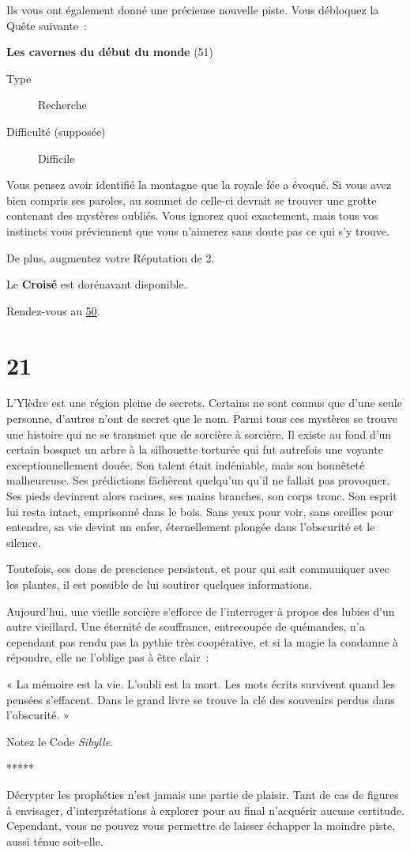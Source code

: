 \documentclass{report}
\newcommand{\gsection}[1]{
    \section{#1}
    \label{section-#1}
}
\newcommand{\glink}[1]{\hyperref[section-#1]{#1}}
\newcommand{\quest}[5]{
    \begin{mdframed}[innertopmargin=0.5cm,innerbottommargin=0.5cm]
        \begin{center}
            \textbf{#1} (#2)
        \end{center}
        \begin{description}
            \item[Type] #3
            \item[Difficulté (supposée)] #4
        \end{description}
        #5
    \end{mdframed}
}
\newcommand{\ellipse}{
    \begin{center}
        *****
    \end{center}
}
\newcommand{\hero}[1]{
    \textbf{#1}
}
\begin{document}
Ils vous ont également donné une précieuse nouvelle piste. Vous débloquez la Quête suivante :

\quest{Les cavernes du début du monde}{51}{Recherche}{Difficile}{
Vous pensez avoir identifié la montagne que la royale fée a évoqué. Si vous avez bien compris ses paroles, au sommet de celle-ci devrait se trouver une grotte contenant des mystères oubliés. Vous ignorez quoi exactement, mais tous vos instincts vous préviennent que vous n'aimerez sans doute pas ce qui s'y trouve.
}

De plus, augmentez votre Réputation de 2.

Le \hero{Croisé} est dorénavant disponible.

Rendez-vous au \glink{50}.

\gsection{21}

L'Ylèdre est une région pleine de secrets. Certains ne sont connus que d'une seule personne, d'autres n'ont de secret que le nom. Parmi tous ces mystères se trouve une histoire qui ne se transmet que de sorcière à sorcière. Il existe au fond d'un certain bosquet un arbre à la silhouette torturée qui fut autrefois une voyante exceptionnellement douée. Son talent était indéniable, mais son honnêteté malheureuse. Ses prédictions fâchèrent quelqu'un qu'il ne fallait pas provoquer. Ses pieds devinrent alors racines, ses mains branches, son corps tronc. Son esprit lui resta intact, emprisonné dans le bois. Sans yeux pour voir, sans oreilles pour entendre, sa vie devint un enfer, éternellement plongée dans l'obscurité et le silence.

Toutefois, ses dons de prescience persistent, et pour qui sait communiquer avec les plantes, il est possible de lui soutirer quelques informations.

Aujourd'hui, une vieille sorcière s'efforce de l'interroger à propos des lubies d'un autre vieillard. Une éternité de souffrance, entrecoupée de quémandes, n'a cependant pas rendu pas la pythie très coopérative, et si la magie la condamne à répondre, elle ne l'oblige pas à être clair :

« La mémoire est la vie. L'oubli est la mort. Les mots écrits survivent quand les pensées s'effacent. Dans le grand livre se trouve la clé des souvenirs perdus dans l'obscurité. »

Notez le Code \emph{Sibylle}.

\ellipse

Décrypter les prophéties n'est jamais une partie de plaisir. Tant de cas de figures à envisager, d'interprétations à explorer pour au final n'acquérir aucune certitude. Cependant, vous ne pouvez vous permettre de laisser échapper la moindre piste, aussi ténue soit-elle.
\end{document}
